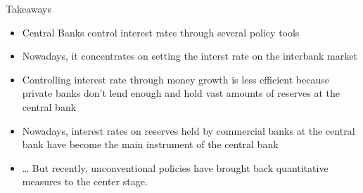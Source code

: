 \documentclass[
  ignorenonframetext,
  aspectratio=169,
]{beamer}
\providecommand{\tightlist}{%
  \setlength{\itemsep}{0pt}\setlength{\parskip}{0pt}}\usepackage{longtable,booktabs,array}
\begin{document}
\begin{frame}{Takeaways}
\begin{itemize}
\tightlist
\item
  Central Banks control interest rates through several policy tools
\item
  Nowadays, it concentrates on setting the interst rate on the interbank
  market
\item
  Controlling interest rate through money growth is less efficient
  because private banks don't lend enough and hold vast amounts of
  reserves at the central bank
\item
  Nowadays, interest rates on reserves held by commercial banks at the
  central bank have become the main instrument of the central bank
\item
  \ldots{} But recently, unconventional policies have brought back
  quantitative measures to the center stage.
\end{itemize}
\end{frame}
\end{document}
